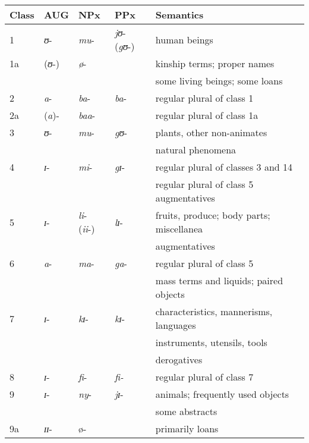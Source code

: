\begin{table}
\small
\begin{tabularx}{\textwidth}{lllll}
	\lsptoprule
	\footnotesize{Class} & \footnotesize{AUG} & \footnotesize{NPx} & \footnotesize{PPx} & \footnotesize{Semantics} \\ 
	\midrule
	
	1 & \textit{ʊ}- & \textit{mu}- & \textit{jʊ}- (\textit{gʊ}-) & human beings \\
	
	1a & (\textit{ʊ}-) & \textit{ø}- & & kinship terms; proper names
	\tabularnewline &  & &  & some living beings; some loans\\
	
	2 & \textit{a}- & \textit{ba}- & \textit{ba}- & regular plural of class 1 \\ 
	
	2a & (\textit{a})- & \textit{baa}- & & regular plural of class 1a\\
	
	3 & \textit{ʊ}- & \textit{mu}- & \textit{gʊ}- & plants, other non-animates
	\tabularnewline &  & &  &  natural phenomena \\ 
	
	4 & \textit{ɪ}- & \textit{mi}- & \textit{gɪ}- & regular plural of classes 3 and 14
	\tabularnewline &  & &  & regular plural of class 5 augmentatives\\ 
	
	5 & \textit{ɪ}- & \textit{li}- (\textit{ii}-) & \textit{lɪ}- & fruits, produce; body parts; miscellanea
	\tabularnewline &  & &  &  augmentatives \\ 
	
	6 & \textit{a}- & \textit{ma}- & \textit{ga}- & regular plural of class 5
	\tabularnewline &  & &  &  mass terms and liquids; paired objects \\
	
	7 & \textit{ɪ}- & \textit{kɪ}- & \textit{kɪ}- & characteristics, mannerisms, languages
	\tabularnewline &  & &  & instruments, utensils, tools
	\tabularnewline & & & & derogatives \\ 
	
	8 & \textit{ɪ}- & \textit{fi}- & \textit{fi-} & regular plural of class 7 \\ 
	
	9 & \textit{ɪ}- & \textit{ny}- & \textit{jɪ}- & animals; frequently used objects \tabularnewline &  & &  & some abstracts \\ 
	
	9a & \textit{ɪɪ}- & ø- &  & primarily loans \\ 
	

\end{tabularx}
\end{table}
